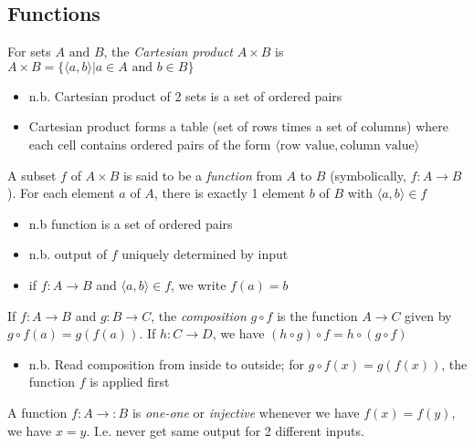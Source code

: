 \subsection{Functions}
\begin{definition}
	For sets $A \text{ and } B$, the \textit{Cartesian product} $A \times B$ is
	$A \times B = \{\langle a,b \rangle | a \in A \text{ and } b \in B\}$
\end{definition}
\begin{itemize}
	\item n.b. Cartesian product of 2 sets is a set of ordered pairs
	\item Cartesian product forms a table (set of rows times a set of
	      columns) where each cell contains ordered pairs of the form $\langle
		      \text{row value}, \text{column value} \rangle$
\end{itemize}

\begin{definition}[Function $f: A \to B$]
	A subset $f$ of $A \times B$ is said to be a \textit{function} from $A$ to
	$B$ (symbolically, $f: A \to B$). For each element $a$ of $A$, there is exactly
	1 element $b$ of $B$ with $\langle a,b \rangle \in f$
\end{definition}
\begin{itemize}
	\item n.b function is a set of ordered pairs
	\item n.b. output of $f$ uniquely determined by input
	\item if $f: A \to B$ and
	      $\langle a,b \rangle \in f$, we write $f(a) = b$
\end{itemize}

\begin{definition}[Function composition $g \circ f = g(f(x))$]
	If $f:A \to B$ and $g: B \to C$, the \textit{composition} $g \circ f$ is the
	function $A \to C$ given by $g \circ f(a) = g(f(a))$. If $h: C \to D$, we have
	$(h \circ g) \circ f = h \circ (g \circ f)$
\end{definition}
\begin{itemize}
	\item n.b. Read composition from inside to outside; for $g \circ f(x) =
		      g(f(x))$, the function $f$ is applied first
\end{itemize}

\begin{definition}
	A function $f: A \to: B$ is \textit{one-one} or \textit{injective} whenever
	we have $f(x) = f(y)$, we have $x=y$. I.e. never get same output for 2
	different inputs.
\end{definition}

